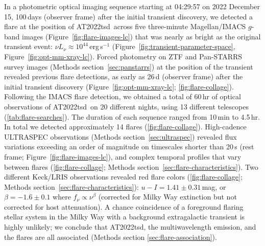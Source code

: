 \documentclass{nature_plusfigure}
\newcommand{\at}{AT2022tsd}
\begin{document}
In a photometric optical imaging sequence starting at 04:29:57 on 2022 December 15, 100\,days (observer frame) after the initial transient discovery, we detected\cite{Ho2022_Astronote_Flares} a flare at the position of \at\ across five three-minute Magellan/IMACS $g$-band images (Figure~\ref{fig:flare-images-lc}) that was nearly as bright as the original transient event: $\nu L_\nu \approx 10^{44}\,$erg\,s$^{-1}$ (Figure~\ref{fig:transient-parameter-space}, Figure~\ref{fig:opt-mm-xray-lc}).
Forced photometry on ZTF and Pan-STARRS survey images (Methods section~\ref{sec:panstarrs}) at the position of the transient revealed previous flare detections, as early as 26\,d (observer frame) after the initial transient discovery (Figure~\ref{fig:opt-mm-xray-lc}; \ref{fig:flare-collage}).
Following the IMACS flare detection, we obtained a total of 60\,hr of optical observations of \at\ on 20 different nights, using 13 different telescopes (\ref{tab:flare-searches}). The duration of each sequence ranged from 10\,min to 4.5\,hr. In total we detected approximately 14 flares (\ref{fig:flare-collage}). High-cadence ULTRASPEC observations (Methods section~\ref{sec:ultraspec}) revealed flux variations exceeding an order of magnitude on timescales shorter than 20\,s (rest frame; Figure~\ref{fig:flare-images-lc}), and complex temporal profiles that vary between flares (\ref{fig:flare-collage}; Methods section~\ref{sec:flare-characteristics}).
Two different Keck/LRIS observations revealed red flare colors (\ref{fig:flare-collage}; Methods section~\ref{sec:flare-characteristics}):
$u-I=1.41\pm0.31\,$mag, or $\beta=-1.6\pm0.1$ where
$f_\nu \propto \nu^{\beta}$ (corrected for Milky Way extinction but not corrected for host attenuation).
A chance coincidence of a foreground flaring stellar system in the Milky Way with a background extragalactic transient is highly unlikely; we conclude that \at, the multiwavelength emission, and the flares are all associated (Methods section \ref{sec:flare-association}).
\end{document}
